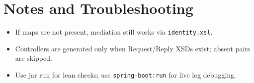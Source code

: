 \documentclass[11pt]{article}
\begin{document}
\section{Notes and Troubleshooting}
\begin{itemize}
  \item If maps are not present, mediation still works via \texttt{identity.xsl}.
  \item Controllers are generated only when Request/Reply XSDs exist; absent pairs are skipped.
  \item Use jar run for lean checks; use \texttt{spring-boot:run} for live log debugging.
\end{itemize}
\end{document}
